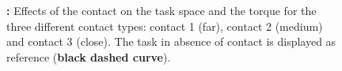 	\begin{figure}[t]
		\caption{\textbf{:} Effects of the contact on the task space and the torque for the three different contact types: contact 1 (far), contact 2 (medium) and contact 3 (close). 
		The task in absence of contact is displayed as reference (\textbf{black dashed curve}). 
		}
		\label{fig:exp2:effects_contact}
        \figspace
	\end{figure}
	
